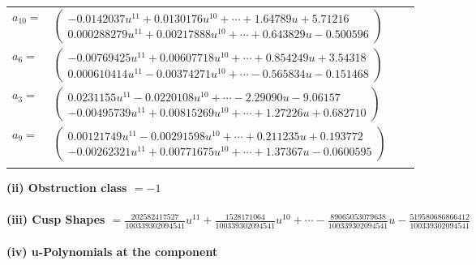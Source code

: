 \documentclass[1p]{elsarticle_modified}
\theoremstyle{definition}
\begin{document}
\begin{tabular}{m{7pt} m{180pt} m{7pt} m{180pt} }
\flushright $a_{10}=$&$\begin{pmatrix}-0.0142037 u^{11}+0.0130176 u^{10}+\cdots+1.64789 u+5.71216\\0.000288279 u^{11}+0.00217888 u^{10}+\cdots+0.643829 u-0.500596\end{pmatrix}$ \\
\flushright $a_{6}=$&$\begin{pmatrix}-0.00769425 u^{11}+0.00607718 u^{10}+\cdots+0.854249 u+3.54318\\0.000610414 u^{11}-0.00374271 u^{10}+\cdots-0.565834 u-0.151468\end{pmatrix}$ \\
\flushright $a_{3}=$&$\begin{pmatrix}0.0231155 u^{11}-0.0220108 u^{10}+\cdots-2.29090 u-9.06157\\-0.00495739 u^{11}+0.00815269 u^{10}+\cdots+1.27226 u+0.682710\end{pmatrix}$ \\
\flushright $a_{9}=$&$\begin{pmatrix}0.00121749 u^{11}-0.00291598 u^{10}+\cdots+0.211235 u+0.193772\\-0.00262321 u^{11}+0.00771675 u^{10}+\cdots+1.37367 u-0.0600595\end{pmatrix}$\\&\end{tabular}
\flushleft \textbf{(ii) Obstruction class $= -1$}\\~\\
\flushleft \textbf{(iii) Cusp Shapes $= \frac{202582417527}{100339302094541} u^{11}+\frac{1528171064}{100339302094541} u^{10}+\cdots-\frac{89065053079638}{100339302094541} u-\frac{519580686866412}{100339302094541}$}\\~\\
\newpage\renewcommand{\arraystretch}{1}
\flushleft \textbf{(iv) u-Polynomials at the component}\newline \\
\end{document}
